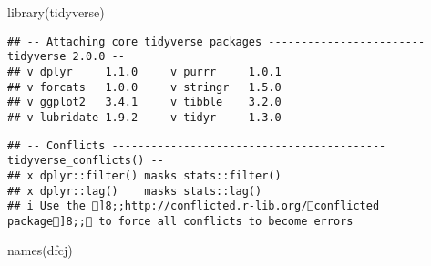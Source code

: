 \documentclass[
]{article}
\newenvironment{Shaded}{\begin{snugshade}}{\end{snugshade}}
\newcommand{\FunctionTok}[1]{\textcolor[rgb]{0.00,0.00,0.00}{#1}}
\newcommand{\NormalTok}[1]{#1}
\begin{document}
\begin{Shaded}
\begin{Highlighting}[]
\FunctionTok{library}\NormalTok{(tidyverse)}
\end{Highlighting}
\end{Shaded}

\begin{verbatim}
## -- Attaching core tidyverse packages ------------------------ tidyverse 2.0.0 --
## v dplyr     1.1.0     v purrr     1.0.1
## v forcats   1.0.0     v stringr   1.5.0
## v ggplot2   3.4.1     v tibble    3.2.0
## v lubridate 1.9.2     v tidyr     1.3.0
\end{verbatim}

\begin{verbatim}
## -- Conflicts ------------------------------------------ tidyverse_conflicts() --
## x dplyr::filter() masks stats::filter()
## x dplyr::lag()    masks stats::lag()
## i Use the ]8;;http://conflicted.r-lib.org/conflicted package]8;; to force all conflicts to become errors
\end{verbatim}

\begin{Shaded}
\begin{Highlighting}[]
\FunctionTok{names}\NormalTok{(dfcj)}
\end{Highlighting}
\end{Shaded}
\end{document}
